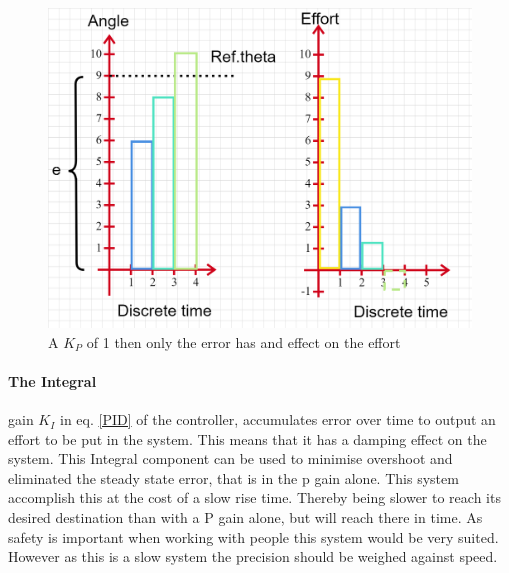 \begin{figure}[H]
    \centering
    \includegraphics[width=\textwidth]{Figures/Technical_figures/PGAIN.png} 
    \caption{A $K_P$ of 1 then only the error has and effect on the effort}
    \label{fig:pGain}
\end{figure}

\paragraph{The Integral} gain $K_I$ in eq. \ref{PID} of the controller, accumulates error over time to output an effort to be put in the system. This means that it has a damping effect on the system. This Integral component can be used to minimise overshoot and eliminated the steady state error, that is in the p gain alone. This system accomplish this at the cost of a slow rise time. Thereby being slower to reach its desired destination than with a P gain alone, but will reach there in time. As safety is important when working with people this system would be very suited. However as this is a slow system the precision should be weighed against speed\cite{Control1DK}. \\

